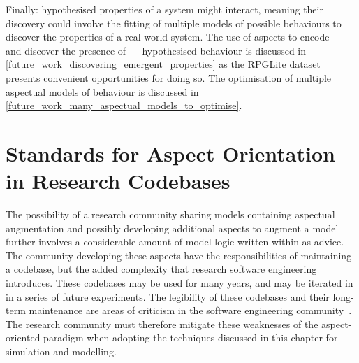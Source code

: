 Finally: hypothesised properties of a system might interact, meaning their
discovery could involve the fitting of multiple models of possible behaviours to
discover the properties of a real-world system. The use of aspects to encode ---
and
discover the presence of --- hypothesised behaviour is discussed in
\cref{future_work_discovering_emergent_properties} as the RPGLite dataset
presents convenient opportunities for doing so. The optimisation of multiple
aspectual models of behaviour is discussed in \cref{future_work_many_aspectual_models_to_optimise}.



\section{Standards for Aspect Orientation in Research
Codebases}
\label{future_work_standard_aosm_techniques}




The possibility of a research community sharing models containing aspectual
augmentation and possibly developing additional aspects to augment a model
further involves a considerable amount of model logic written within as advice.
The community developing these aspects have the responsibilities of maintaining
a codebase, but the added complexity that research software engineering
introduces. These codebases may be used for many years, and may be iterated in
in a series of future experiments. The legibility of these codebases and their
long-term maintenance are areas of criticism in the software engineering
community~\cite{steimann06paradoxical,przybylek2010wrong,Constantinides04aopconsidered}.
The research community must therefore mitigate these weaknesses of the
aspect-oriented paradigm when adopting the techniques discussed in this chapter
for simulation and modelling.

